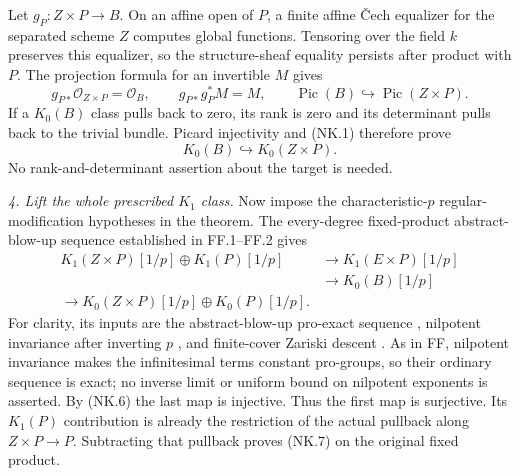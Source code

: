 Let $g_P:Z\times P\to B$.  On an affine open of $P$, a finite
affine \v{C}ech equalizer for the separated scheme $Z$ computes
global functions.  Tensoring over the field $k$ preserves this
equalizer, so the structure-sheaf equality persists after product
with $P$.  The projection formula for an invertible $M$ gives
\begin{equation}
 g_{P*}\mathcal O_{Z\times P}=\mathcal O_B,
 \qquad g_{P*}g_P^*M=M,
 \qquad\operatorname{Pic}(B)\hookrightarrow
                          \operatorname{Pic}(Z\times P).
                                                        \tag{NK.5}
\end{equation}
If a $K_0(B)$ class pulls back to zero, its rank is zero and its
determinant pulls back to the trivial bundle.  Picard injectivity
and (NK.1) therefore prove
\begin{equation}
                 K_0(B)\hookrightarrow K_0(Z\times P).
                                                        \tag{NK.6}
\end{equation}
No rank-and-determinant assertion about the target is needed.

\emph{4. Lift the whole prescribed $K_1$ class.}
Now impose the characteristic-$p$ regular-modification hypotheses
in the theorem.  The every-degree fixed-product abstract-blow-up
sequence established in FF.1--FF.2 gives
\begin{equation}
\begin{split}
 K_1(Z\times P)[1/p]\oplus K_1(P)[1/p]
 &\longrightarrow K_1(E\times P)[1/p]\\
 &\longrightarrow K_0(B)[1/p]\\
 \longrightarrow K_0(Z\times P)[1/p]\oplus K_0(P)[1/p].
\end{split}                                               \tag{NK.8}
\end{equation}
For clarity, its inputs are the abstract-blow-up pro-exact sequence
\citep[Theorem A and (1.6)]{rootKerzStrunkTamme2018}, nilpotent
invariance after inverting $p$
\citep[Theorem A]{rootGeisserHesselholt2011}, and finite-cover
Zariski descent \citep[Theorem 8.1]{D_ThomasonTrobaugh1990}.
As in FF, nilpotent invariance makes the infinitesimal terms
constant pro-groups, so their ordinary sequence is exact; no inverse
limit or uniform bound on nilpotent exponents is asserted.
By (NK.6) the last map is injective.  Thus the first map is
surjective.  Its $K_1(P)$ contribution is already the restriction
of the actual pullback along $Z\times P\to P$.  Subtracting that
pullback proves (NK.7) on the original fixed product.

